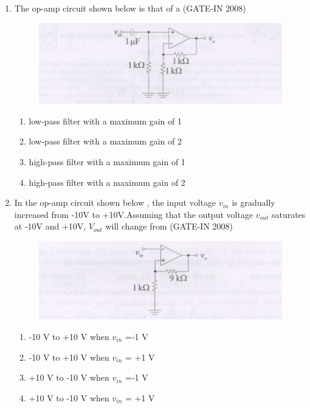 \documentclass[journal,12pt,onecolumn]{IEEEtran}
\theoremstyle{remark}
\begin{document}
\begin{enumerate}
    \item  The op-amp circuit shown below  is that of a \hfill{(GATE-IN 2008)}
    \begin{figure}[H]
    \centering
    \includegraphics[width=0.5\columnwidth]{figs/i19.jpg}
    \caption{}
    \label{fig:placeholder19}
\end{figure}
\begin{multicols}{2}
    \begin{enumerate} 
        \item low-pass filter with a maximum gain of 1 
        \item low-pass filter with a maximum gain of 2
        \item high-pass filter with a maximum gain of 1 
        \item high-pass filter with a maximum gain of 2
    \end{enumerate}
    \end{multicols}
    
    \item In the op-amp circuit shown below , the input voltage $v_{in}$ is gradually increased from -10V to +10V.Assuming that the output voltage $v_{out}$ saturates at -10V and +10V, $V_{out}$ will change from \hfill{(GATE-IN 2008)}
    
    \begin{figure}[H]
    \centering
    \includegraphics[width=0.5\columnwidth]{figs/i20.jpg}
    \caption{}
    \label{fig:placeholder20}
\end{figure}
\begin{multicols}{2}
    \begin{enumerate} 
        \item -10 V to +10 V when $v_{in}$ =-1 V
        \item -10 V to +10 V when $v_{in}$ = +1 V
        \item +10 V to -10 V when $v_{in}$ =-1 V
        \item +10 V to -10 V when $v_{in}$ = +1 V
    \end{enumerate}
    \end{multicols}
    

\end{enumerate}
\end{document}
